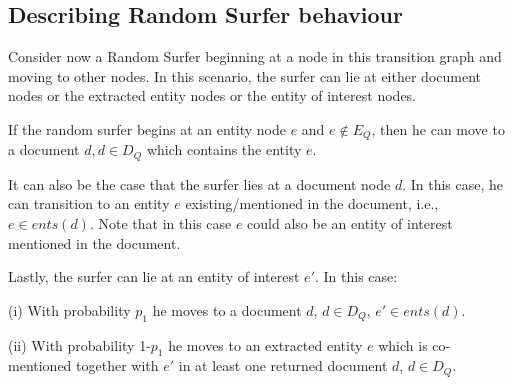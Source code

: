 
\subsection*{Describing Random Surfer behaviour}

Consider now a Random Surfer beginning at a node in this transition graph and
moving to other nodes.
In this scenario, the surfer can lie at either document nodes or
the extracted entity nodes or the entity of interest nodes.

\vspace{2mm}\noindent
If the random surfer begins at an entity node $e$ and $e \notin E_Q$,
then he can move to a document $d, d \in D_Q$ which contains the entity $e$.

\vspace{2mm}\noindent
It can also be the case that the surfer lies at a document node $d$.
In this case, he can transition to an entity $e$ existing/mentioned
in the document, i.e., $e \in ents(d)$.
Note that in this case $e$ could also be an entity of interest mentioned
in the document.

\vspace{2mm}\noindent
Lastly, the surfer can lie at an entity of interest $e'$.
In this case:
\begin{compactitem}
\item[(i)] With probability $p_1$ he moves to a document $d$, $d \in D_Q$, $e' \in ents(d)$.
\item[(ii)] With probability 1-$p_1$ he moves to an extracted entity $e$ which is co-mentioned
together with $e'$ in at least one returned document $d$, $d \in D_Q$.
\end{compactitem}

